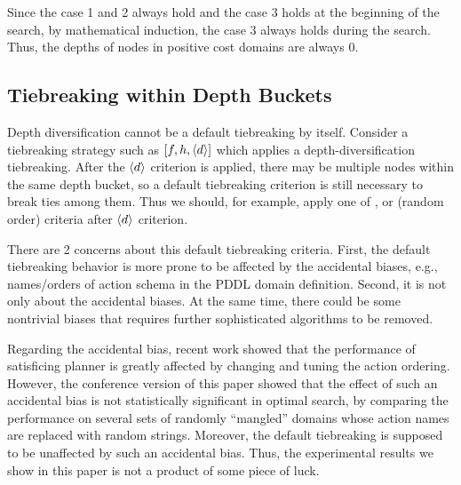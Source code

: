 Since the case 1 and 2 always hold and the case 3 holds at the beginning of the search,
by mathematical induction, the case 3 always holds during the search.
Thus, the depths of nodes in positive cost domains are always 0.

\subsection{Tiebreaking within Depth Buckets}

Depth diversification cannot be a default tiebreaking by itself.
Consider a tiebreaking strategy such as $[f,h,{\left<d\right>}]$ which applies a depth-diversification tiebreaking.
After the ${\left<d\right>}$ criterion is applied, 
there may be multiple nodes within the same depth bucket, so a
default tiebreaking criterion is still necessary to break ties among them.
Thus we should, for example, apply one of \lifo, \fifo or \ro (random order) criteria
after ${\left<d\right>}$ criterion.

There are 2 concerns about this default tiebreaking criteria.
First, the default tiebreaking behavior is more prone to be
affected by the accidental biases, e.g., names/orders of action schema in the PDDL domain definition.
Second, it is not only about the accidental biases.
At the same time, there could be some nontrivial biases that requires further
sophisticated algorithms to be removed.


Regarding the accidental bias, recent work \cite{vallati2015effective} showed that the performance of satisficing
planner is greatly affected by changing and tuning the action ordering.
However, the conference version of this paper \cite{Asai2016} showed that
the effect of such an accidental bias is not statistically significant in optimal search,
by comparing the performance on
several sets of randomly ``mangled'' domains whose action names are replaced with random strings.
Moreover, the \ro default tiebreaking is supposed to be unaffected by such an accidental bias.
Thus, the experimental results we show in this paper is not a product of some piece of luck.



